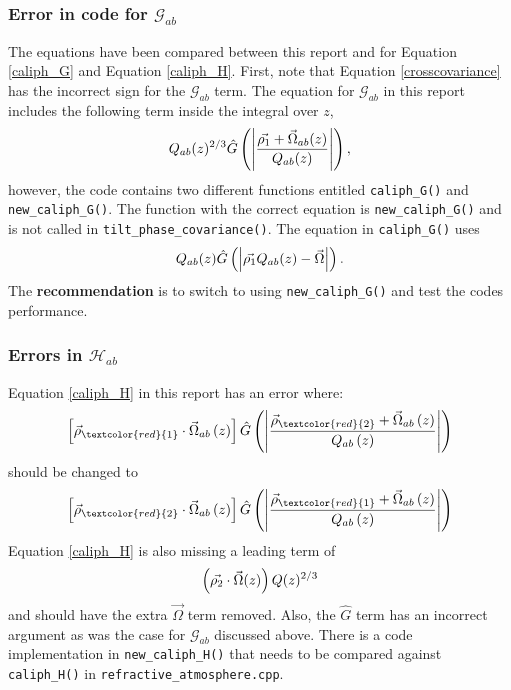 \subsubsection{Error in code for $\mathcal{G}_{ab}$}
The equations have been compared between this report and \cite{Tyler:1994c} 
for Equation \ref{caliph_G} and Equation \ref{caliph_H}. First, note that 
Equation \ref{crosscovariance} has the incorrect sign for the $\mathcal{G}_{ab}$ term. 
The equation for $\mathcal{G}_{ab}$ in this report includes the following
term inside the integral over $z$,
\begin{equation}
\label{eqn:caliph_G_zint_term}
Q_{ab}(z)^{2/3} \hat{G} \left( \left| \frac{\vec{\rho_1} + \vec{\Omega}_{ab}(z)}
{Q_{ab}(z)} \right| \right),
\end{equation}
however, the code contains two different functions entitled \texttt{caliph\_G()} 
and \texttt{new\_caliph\_G()}. The function with the correct equation is
\texttt{new\_caliph\_G()} and is not called in \texttt{tilt\_phase\_covariance()}. The
equation in \texttt{caliph\_G()} uses 
\begin{equation}
Q_{ab}(z) \hat{G} \left( \left| \vec{\rho_1} Q_{ab}(z) - \vec{\Omega} \right| \right).
\end{equation}
The {\bf recommendation} is to switch to using \texttt{new\_caliph\_G()} and test the 
codes performance.

\subsubsection{Errors in $\mathcal{H}_{ab}$}
Equation \ref{caliph_H} in this report has an error where:
\begin{equation}
\left[\vec{\rho}_{\textcolor{red}{1}}\cdot\vec{\Omega}_{ab}\left(z\right)\right]
\hat{G}\left(\left\vert \frac{\vec{\rho}_{\textcolor{red}{2}} + 
\vec{\Omega}_{ab}\left(z\right)}{Q_{ab}\left(z\right)}\right\vert\right)
\end{equation}
should be changed to
\begin{equation}
\left[\vec{\rho}_{\textcolor{red}{2}}\cdot\vec{\Omega}_{ab}\left(z\right)\right]
\hat{G}\left(\left\vert \frac{\vec{\rho}_{\textcolor{red}{1}} + 
\vec{\Omega}_{ab}\left(z\right)}{Q_{ab}\left(z\right)}\right\vert\right)
\end{equation}
Equation \ref{caliph_H} is also missing a leading term of 
\begin{equation}
\left( \vec{\rho_2} \cdot \vec{\Omega}(z) \right) Q(z)^{2/3}
\end{equation}
and should have the extra $\vec{\Omega}$ term removed. 
Also, the $\hat{G}$ term has an incorrect argument as was the case for $\mathcal{G}_{ab}$ 
discussed above.  There is a code implementation in \texttt{new_caliph_H()} that needs 
to be compared against \texttt{caliph_H()} in \texttt{refractive_atmosphere.cpp}.


